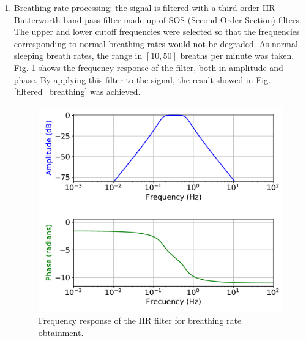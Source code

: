 \documentclass[twoside, twocolumn, spanish] {article}
\begin{document}
\begin{enumerate}
\item Breathing rate processing: the signal is filtered with a third order IIR Butterworth band-pass filter made up of SOS (Second Order Section) filters. The upper and lower cutoff frequencies were selected so that the frequencies corresponding to normal breathing rates would not be degraded. As normal sleeping breath rates, the range in $[10,50]$ breaths per minute was taken. Fig. \ref{filter} shows the frequency response of the filter, both in amplitude and phase. By applying this filter to the signal, the result showed in Fig. \ref{filtered_breathing} was achieved.

\begin{figure}[!h]
\centering
\includegraphics[width=\columnwidth]{imag/proc4}
\caption{Frequency response of the IIR filter for breathing rate obtainment.}  \label{filter}
\end{figure}



\end{enumerate}
\end{document}
